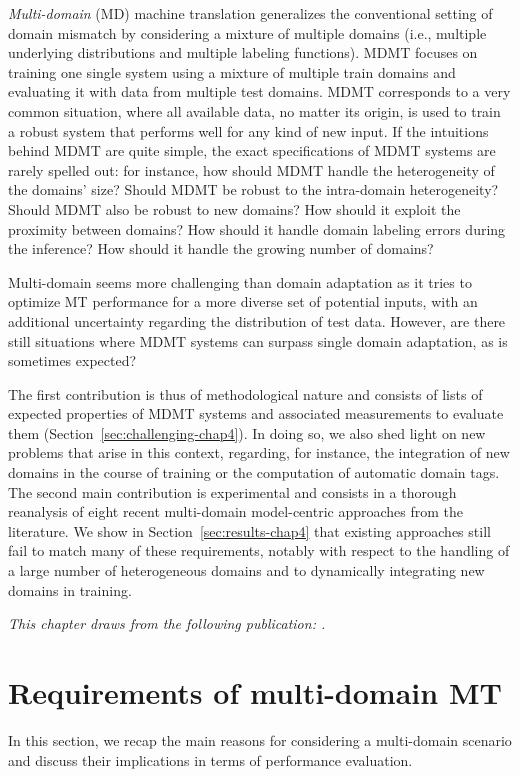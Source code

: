 \emph{Multi-domain} (MD) machine translation \citep{Sajjad17neural,Farajian17multidomain,Kobus17domain,Zeng18multidomain,Pham19generic} 
generalizes the conventional setting of domain mismatch by considering a mixture of multiple domains (i.e., multiple underlying distributions and multiple labeling functions). MDMT focuses on training one single system using a mixture of multiple train domains and evaluating it with data from multiple test domains. MDMT corresponds to a very common situation, where all available data, no matter its origin, is used to train a robust system that performs well for any kind of new input. If the intuitions behind MDMT are quite simple, the exact specifications of MDMT systems are rarely spelled out: for instance, how should MDMT handle the heterogeneity of the domains' size? Should MDMT be robust to the intra-domain heterogeneity? Should MDMT also be robust to new domains? How should it exploit the proximity between domains? How should it handle domain labeling errors during the inference? How should it handle the growing number of domains? 

Multi-domain seems more challenging than domain adaptation as it tries to optimize MT performance for a more diverse set of potential inputs, with an additional uncertainty regarding the distribution of test data. However, are there still situations where MDMT systems can surpass single domain adaptation, as is sometimes expected? 

The first contribution is thus of methodological nature and consists of lists of expected properties of MDMT systems and associated measurements to evaluate them (Section~\ref{sec:challenging-chap4}). In doing so, we also shed light on new problems that arise in this context, regarding, for instance, the integration of new domains in the course of training or the computation of automatic domain tags. The second main contribution is experimental and consists in a thorough reanalysis of eight recent multi-domain model-centric approaches from the literature. We show in Section~\ref{sec:results-chap4} that existing approaches still fail to match many of these requirements, notably with respect to the handling of a large number of heterogeneous domains and to dynamically integrating new domains in training.

\textit{This chapter draws from the following publication: \citet{Pham21revisiting}.}
 
\section{Requirements of multi-domain MT \label{sec:requirements-chap4}}
In this section, we recap the main reasons for considering a multi-domain scenario and discuss their implications in terms of performance evaluation.


